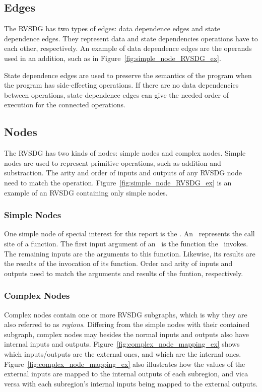 \subsection{Edges}

The RVSDG has two types of edges: data dependence edges and state dependence
edges. They represent data and state dependencies operations have to each other,
respectively. An example of data dependence edges are the operands used in an
addition, such as in Figure~\ref{fig:simple_node_RVSDG_ex}.

State dependence edges are used to preserve the semantics of the program when
the program has side-effecting operations. If there are no data dependencies
between operations, state dependence edges can give the needed order of
execution for the connected operations.

\subsection{Nodes}

The RVSDG has two kinds of nodes: simple nodes and complex nodes. Simple nodes
are used to represent primitive operations, such as addition and substraction.
The arity and order of inputs and outputs of any RVSDG node need to match the
operation. Figure~\ref{fig:simple_node_RVSDG_ex} is an example of an RVSDG
containing only simple nodes.

\subsubsection{Simple Nodes}

One simple node of special interest for this report is the \applyNode . An
\applyNode~represents the call site of a function. The first input argument of
an \applyNode~is the function the \applyNode~invokes. The remaining inputs are
the arguments to this function. Likewise, its results are the results of the
invocation of its function. Order and arity of inputs and outputs need to match
the arguments and results of the funtion, respectively.

\subsubsection{Complex Nodes}

Complex nodes contain one or more RVSDG subgraphs, which is why they are also
referred to as \textit{regions}. Differing from the simple nodes with their
contained subgraph, complex nodes may besides the normal inputs and outputs also
have internal inputs and outputs. Figure~\ref{fig:complex_node_mapping_ex} shows
which inputs/outputs are the external ones, and which are the internal ones.
Figure~\ref{fig:complex_node_mapping_ex} also illustrates how the values of the
external inputs are mapped to the internal outputs of each subregion, and vica
versa with each subregion's internal inputs being mapped to the external
outputs.

